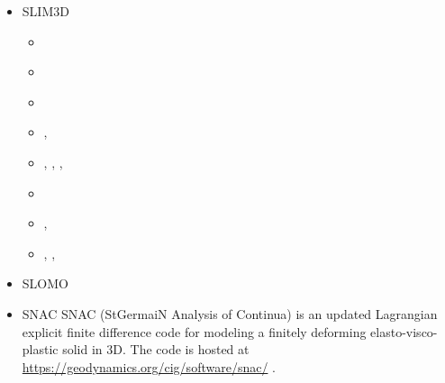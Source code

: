 \begin{itemize}
\begin{scriptsize}
\begin{itemize}
\item[\twothousandsixteen]   \textcite{olbm16} 
\item[\twothousandeighteen]  \textcite{weib18}
\item[\twothousandtwentyone] \textcite{haao21}
\end{itemize}
\end{scriptsize}

\item {\codefont SLIM3D} 

\begin{scriptsize}
\begin{itemize}
\item[\twothousandeight]     \textcite{poso08}
\item[\twothousandten]       \textcite{qusp10}
\item[\twothousandtwelve]    \textcite{brps12}
\item[\twothousandthirteen]  \textcite{brps13},  \textcite{brau13}
\item[\twothousandfourteen]  \textcite{brun14},  \textcite{hebr14},  \textcite{kobf14},
                             \textcite{brhp14}
\item[\twothousandfifteen]   \textcite{clbq15}
\item[\twothousandseventeen] \textcite{brcr17},  \textcite{baso17} 
\item[\twothousandeighteen]  \textcite{basq18},  \textcite{osss18},  \textcite{osss18b}
\end{itemize}
\end{scriptsize}

\item {\codefont SLOMO} 

{\small
\noindent
\textcite{kaus05}
\textcite{kasb08}
}

\item {\codefont SNAC} 
SNAC (StGermaiN Analysis of Continua) is an updated Lagrangian explicit finite 
difference code for modeling a finitely deforming elasto-visco-plastic solid in 3D.
The code is hosted at \url{https://geodynamics.org/cig/software/snac/} .


\end{itemize}
